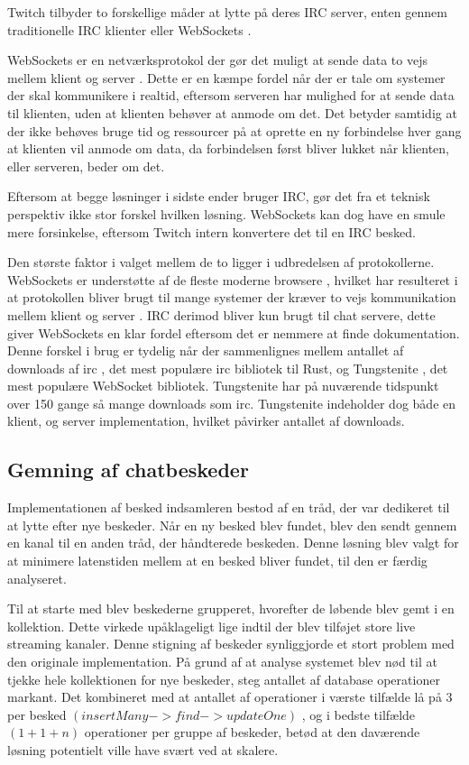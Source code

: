\documentclass{article}
\begin{document}
Twitch tilbyder to forskellige måder at lytte på deres IRC server, enten gennem traditionelle IRC klienter eller WebSockets \cite{twitch_twitch_2022}.

WebSockets er en netværksprotokol der gør det muligt at sende data to vejs mellem klient og server \cite{melnikov_websocket_2011}. Dette er en kæmpe fordel når der er tale om systemer der skal kommunikere i realtid, eftersom serveren har mulighed for at sende data til klienten, uden at klienten behøver at anmode om det. Det betyder samtidig at der ikke behøves bruge tid og ressourcer på at oprette en ny forbindelse hver gang at klienten vil anmode om data, da forbindelsen først bliver lukket når klienten, eller serveren, beder om det.

Eftersom at begge løsninger i sidste ender bruger IRC, gør det fra et teknisk perspektiv ikke stor forskel hvilken løsning. WebSockets kan dog have en smule mere forsinkelse, eftersom Twitch intern konvertere det til en IRC besked.

Den største faktor i valget mellem de to ligger i udbredelsen af protokollerne. WebSockets er understøtte af de fleste moderne browsere \cite{caniuse_websockets}, hvilket har resulteret i at protokollen bliver brugt til mange systemer der kræver to vejs kommunikation mellem klient og server \cite{murley_websocket_2021}. IRC derimod bliver kun brugt til chat servere, dette giver WebSockets en klar fordel eftersom det er nemmere at finde dokumentation.
Denne forskel i brug er tydelig når der sammenlignes mellem antallet af downloads af irc \cite{cratesio_irc_nodate}, det mest populære irc bibliotek til Rust, og Tungstenite \cite{cratesio_tungstenite_nodate}, det mest populære WebSocket bibliotek. Tungstenite har på nuværende tidspunkt over 150 gange så mange downloads som irc. Tungstenite indeholder dog både en klient, og server implementation, hvilket påvirker antallet af downloads.


\subsection{Gemning af chatbeskeder}
Implementationen af besked indsamleren bestod af en tråd, der var dedikeret til at lytte efter nye beskeder. Når en ny besked blev fundet, blev den sendt gennem en kanal til en anden tråd, der håndterede beskeden. Denne løsning blev valgt for at minimere latenstiden mellem at en besked bliver fundet, til den er færdig analyseret.

Til at starte med blev beskederne grupperet, hvorefter de løbende blev gemt i en kollektion. Dette virkede upåklageligt lige indtil der blev tilføjet store live streaming kanaler. Denne stigning af beskeder synliggjorde et stort problem med den originale implementation. På grund af at analyse systemet blev nød til at tjekke hele kollektionen for nye beskeder, steg antallet af database operationer markant. Det kombineret med at antallet af operationer i værste tilfælde lå på 3 per besked \((insertMany -> find -> updateOne)\) , og i bedste tilfælde \((1 + 1 + n)\) operationer per gruppe af beskeder, betød at den daværende løsning potentielt ville have svært ved at skalere.
\end{document}
